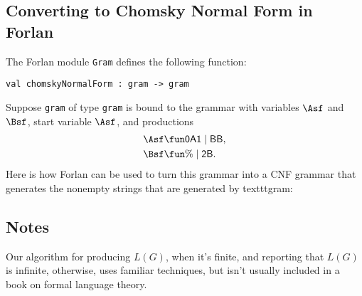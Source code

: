 \subsection*{Converting to Chomsky Normal Form in Forlan}

The Forlan module \texttt{Gram} defines the following function:
\begin{verbatim}
val chomskyNormalForm : gram -> gram
\end{verbatim}
Suppose \texttt{gram} of type \texttt{gram} is bound to the grammar with
variables $\Asf$ and $\Bsf$, start variable $\Asf$, and productions
\begin{align*}
  \Asf &\fun \mathsf{0A1} \mid \mathsf{BB} , \\
  \Bsf &\fun \% \mid \mathsf{2B} .
\end{align*}
Here is how Forlan can be used to turn this grammar into a CNF
grammar that generates the nonempty strings that are generated by
texttt{gram}:


\subsection{Notes}

Our algorithm for producing $L(G)$, when it's finite, and reporting
that $L(G)$ is infinite, otherwise, uses familiar techniques, but
isn't usually included in a book on formal language theory.

